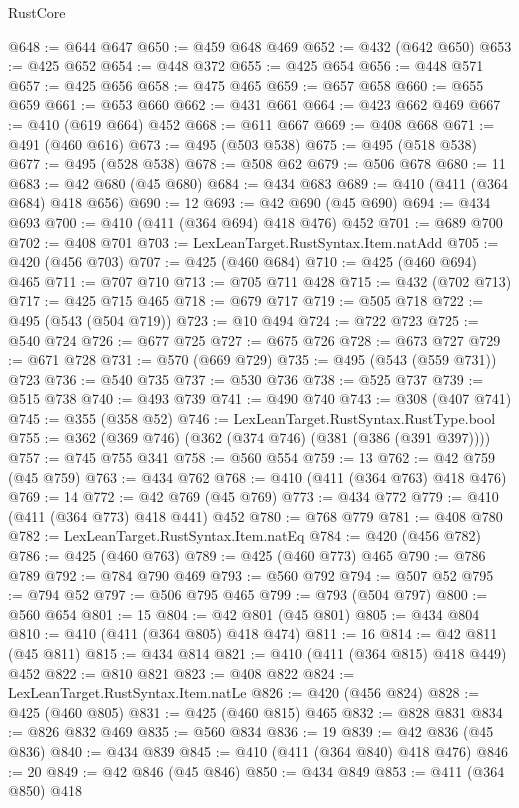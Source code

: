 \begin{lexlean}{RustCore}
\begin{coremodule}
@648 := @644 @647
@650 := @459 @648 @469
@652 := @432 (@642 @650)
@653 := @425 @652
@654 := @448 @372
@655 := @425 @654
@656 := @448 @571
@657 := @425 @656
@658 := @475 @465
@659 := @657 @658
@660 := @655 @659
@661 := @653 @660
@662 := @431 @661
@664 := @423 @662 @469
@667 := @410 (@619 @664) @452
@668 := @611 @667
@669 := @408 @668
@671 := @491 (@460 @616)
@673 := @495 (@503 @538)
@675 := @495 (@518 @538)
@677 := @495 (@528 @538)
@678 := @508 @62
@679 := @506 @678
@680 := 11
@683 := @42 @680 (@45 @680)
@684 := @434 @683
@689 := @410 (@411 (@364 @684) @418 @656)
@690 := 12
@693 := @42 @690 (@45 @690)
@694 := @434 @693
@700 := @410 (@411 (@364 @694) @418 @476) @452
@701 := @689 @700
@702 := @408 @701
@703 := LexLeanTarget.RustSyntax.Item.natAdd
@705 := @420 (@456 @703)
@707 := @425 (@460 @684)
@710 := @425 (@460 @694) @465
@711 := @707 @710
@713 := @705 @711 @428
@715 := @432 (@702 @713)
@717 := @425 @715 @465
@718 := @679 @717
@719 := @505 @718
@722 := @495 (@543 (@504 @719))
@723 := @10 @494
@724 := @722 @723
@725 := @540 @724
@726 := @677 @725
@727 := @675 @726
@728 := @673 @727
@729 := @671 @728
@731 := @570 (@669 @729)
@735 := @495 (@543 (@559 @731)) @723
@736 := @540 @735
@737 := @530 @736
@738 := @525 @737
@739 := @515 @738
@740 := @493 @739
@741 := @490 @740
@743 := @308 (@407 @741)
@745 := @355 (@358 @52)
@746 := LexLeanTarget.RustSyntax.RustType.bool
@755 := @362 (@369 @746) (@362 (@374 @746) (@381 (@386 (@391 @397))))
@757 := @745 @755 @341
@758 := @560 @554
@759 := 13
@762 := @42 @759 (@45 @759)
@763 := @434 @762
@768 := @410 (@411 (@364 @763) @418 @476)
@769 := 14
@772 := @42 @769 (@45 @769)
@773 := @434 @772
@779 := @410 (@411 (@364 @773) @418 @441) @452
@780 := @768 @779
@781 := @408 @780
@782 := LexLeanTarget.RustSyntax.Item.natEq
@784 := @420 (@456 @782)
@786 := @425 (@460 @763)
@789 := @425 (@460 @773) @465
@790 := @786 @789
@792 := @784 @790 @469
@793 := @560 @792
@794 := @507 @52
@795 := @794 @52
@797 := @506 @795 @465
@799 := @793 (@504 @797)
@800 := @560 @654
@801 := 15
@804 := @42 @801 (@45 @801)
@805 := @434 @804
@810 := @410 (@411 (@364 @805) @418 @474)
@811 := 16
@814 := @42 @811 (@45 @811)
@815 := @434 @814
@821 := @410 (@411 (@364 @815) @418 @449) @452
@822 := @810 @821
@823 := @408 @822
@824 := LexLeanTarget.RustSyntax.Item.natLe
@826 := @420 (@456 @824)
@828 := @425 (@460 @805)
@831 := @425 (@460 @815) @465
@832 := @828 @831
@834 := @826 @832 @469
@835 := @560 @834
@836 := 19
@839 := @42 @836 (@45 @836)
@840 := @434 @839
@845 := @410 (@411 (@364 @840) @418 @476)
@846 := 20
@849 := @42 @846 (@45 @846)
@850 := @434 @849
@853 := @411 (@364 @850) @418

\end{coremodule}
\end{lexlean}
